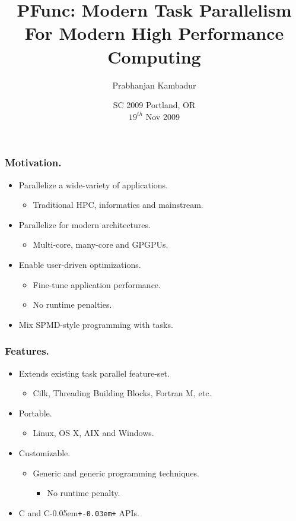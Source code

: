 \documentclass{beamer}
\title{PFunc: Modern Task Parallelism For Modern High Performance Computing}
\author{Prabhanjan Kambadur}
\date{{\small SC 2009}
{\footnotesize Portland, OR}\\
$19^{th}$ Nov 2009}
\newcommand{\Cpp}{C\kern-0.05em\texttt{+\kern-0.03em+}}
\begin{document}
\begin{frame}
  \titlepage
\end{frame}

\begin{frame}
\frametitle{Motivation.}
\begin{itemize}
\item Parallelize a wide-variety of applications.
  \begin{itemize}
  \item Traditional HPC, informatics and mainstream.
  \end{itemize}
\item Parallelize for modern architectures.
  \begin{itemize}
  \item Multi-core, many-core and GPGPUs.
  \end{itemize}
\item Enable user-driven optimizations.
  \begin{itemize}
  \item Fine-tune application performance.
  \item No runtime penalties.
  \end{itemize}
\item Mix SPMD-style programming with tasks.
\end{itemize}
\end{frame}

\begin{frame}
\frametitle{Features.}
\begin{itemize}
\item Extends existing task parallel feature-set. 
  \begin{itemize}
  \item Cilk, Threading Building Blocks, Fortran M, etc.
  \end{itemize}
\item Portable.
  \begin{itemize}
  \item Linux, OS X, AIX and Windows.
  \end{itemize}
\item Customizable.
  \begin{itemize}
  \item Generic and generic programming techniques.
    \begin{itemize}
    \item No runtime penalty.
    \end{itemize}
  \end{itemize}
\item C and \Cpp{} APIs.
\end{itemize}
\end{frame}
\end{document}
